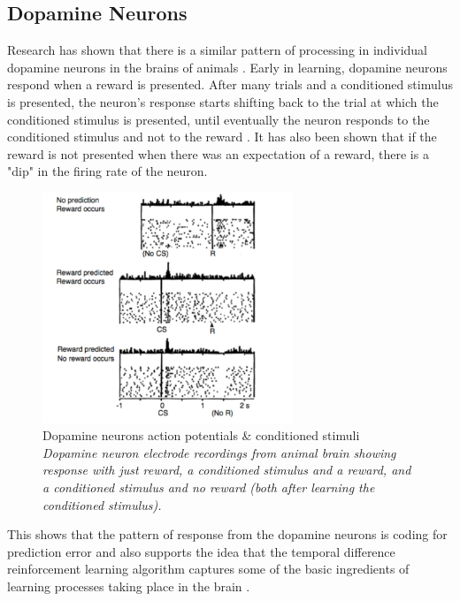 \documentclass[10pt,letterpaper]{article}
\begin{document}
\subsection{Dopamine Neurons}
Research has shown that there is a similar pattern of processing in individual dopamine neurons in the brains of animals \cite{Diederen2020, Pan2005, Schultz2016}. Early in learning, dopamine neurons respond when a reward is presented. After many trials and a conditioned stimulus is presented, the neuron's response starts shifting back to the trial at which the conditioned stimulus is presented, until eventually the neuron responds to the conditioned stimulus and not to the reward \cite{Pan2005, Schultz2016}. It has also been shown that if the reward is not presented when there was an expectation of a reward, there is a "dip" in the firing rate of the neuron. 

\begin{figure}[H]
   \centering
    \includegraphics[width = 75mm]{graphs/dopamine.png}
    \caption{Dopamine neurons action potentials \& conditioned stimuli
    \newline \emph{Dopamine neuron electrode recordings from animal brain showing response with just reward, a conditioned stimulus and a reward, and a conditioned stimulus and no reward (both after learning the conditioned stimulus).}}
    \label{fig:Dopamine Neurons}
\end{figure}

This shows that the pattern of response from the dopamine neurons is coding for prediction error and also supports the idea that the temporal difference reinforcement learning algorithm captures some of the basic ingredients of learning processes taking place in the brain \cite{Pan2005,ReddishJohnson2004}.
\end{document}
